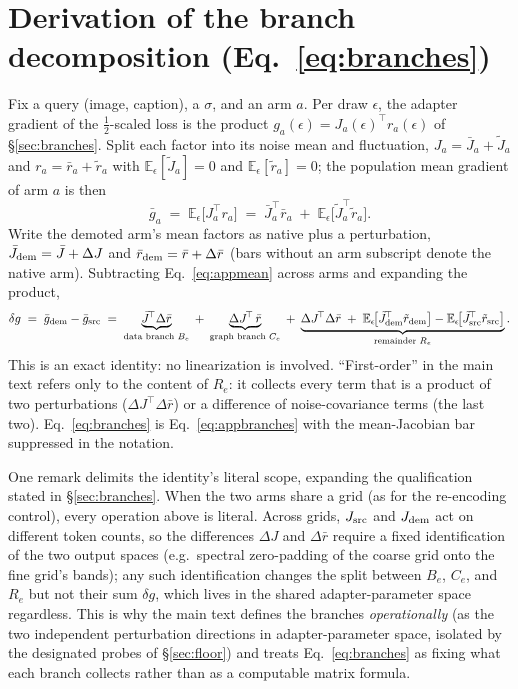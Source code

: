 \appendix
\section{Derivation of the branch decomposition
(Eq.~\ref{eq:branches})}
\label{app:branches}

Fix a query (image, caption), a $\sigma$, and an arm $a$. Per draw
$\epsilon$, the adapter gradient of the $\tfrac12$-scaled loss is the
product $g_a(\epsilon) = J_a(\epsilon)^{\!\top} r_a(\epsilon)$ of
\S\ref{sec:branches}. Split each factor into its noise mean and
fluctuation, $J_a = \bar J_a + \tilde J_a$ and
$r_a = \bar r_a + \tilde r_a$ with
$\mathbb{E}_\epsilon[\tilde J_a] = 0$ and
$\mathbb{E}_\epsilon[\tilde r_a] = 0$; the population mean gradient of
arm $a$ is then
\begin{equation}
\bar g_a \;=\; \mathbb{E}_\epsilon\!\big[J_a^{\!\top} r_a\big]
\;=\; \bar J_a^{\!\top} \bar r_a
\;+\; \mathbb{E}_\epsilon\!\big[\tilde J_a^{\!\top} \tilde r_a\big].
\label{eq:appmean}
\end{equation}
Write the demoted arm's mean factors as native plus a perturbation,
$\bar J_{\mathrm{dem}} = \bar J + \Delta J$ and $\bar r_{\mathrm{dem}} = \bar r + \Delta \bar r$
(bars without an arm subscript denote the native arm). Subtracting
Eq.~\ref{eq:appmean} across arms and expanding the product,
\begin{equation}
\delta g \;=\; \bar g_{\mathrm{dem}} - \bar g_{\mathrm{src}}
\;=\;
\underbrace{\bar J^{\!\top} \Delta\bar r}_{\text{data branch }B_e}
\;+\;
\underbrace{\Delta J^{\!\top}\, \bar r}_{\text{graph branch }C_e}
\;+\;
\underbrace{\Delta J^{\!\top} \Delta\bar r
\;+\;
\mathbb{E}_\epsilon\!\big[\tilde J_{\mathrm{dem}}^{\!\top}\tilde r_{\mathrm{dem}}\big]
- \mathbb{E}_\epsilon\!\big[\tilde J_{\mathrm{src}}^{\!\top}
\tilde r_{\mathrm{src}}\big]}_{\text{remainder }R_e}.
\label{eq:appbranches}
\end{equation}
This is an exact identity: no linearization is involved.
``First-order'' in the main text refers only to the content of $R_e$:
it collects every term that is a product of two perturbations
($\Delta J^{\!\top} \Delta\bar r$) or a difference of noise-covariance
terms (the last two). Eq.~\ref{eq:branches} is
Eq.~\ref{eq:appbranches} with the mean-Jacobian bar suppressed in the
notation.

One remark delimits the identity's literal scope, expanding the
qualification stated in \S\ref{sec:branches}. When the two arms share
a grid (as for the re-encoding control), every operation above is
literal. Across grids, $J_{\mathrm{src}}$ and $J_{\mathrm{dem}}$ act on different
token counts, so the differences $\Delta J$ and $\Delta \bar r$ require
a fixed identification of the two output spaces (e.g.\ spectral
zero-padding of the coarse grid onto the fine grid's bands); any such
identification changes the split between $B_e$, $C_e$, and $R_e$ but
not their sum $\delta g$, which lives in the shared adapter-parameter
space regardless. This is why the main text defines the branches
\emph{operationally} (as the two independent perturbation directions
in adapter-parameter space, isolated by the designated probes of
\S\ref{sec:floor}) and treats Eq.~\ref{eq:branches} as fixing what
each branch collects rather than as a computable matrix formula.

